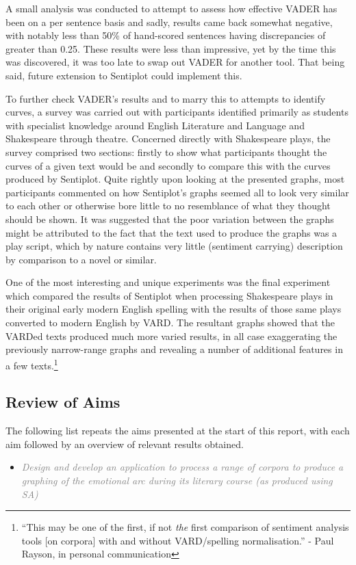 \documentclass{article}
\begin{document}
{    A small analysis was conducted to attempt to assess how effective VADER has been on a per sentence basis and sadly, results came back somewhat negative, with notably less than 50\% of hand-scored sentences having discrepancies of greater than 0.25. These results were less than impressive, yet by the time this was discovered, it was too late to swap out VADER for another tool. That being said, future extension to Sentiplot could implement this.
    
    To further check VADER's results and to marry this to attempts to identify curves, a survey was carried out with participants identified primarily as students with specialist knowledge around English Literature and Language and Shakespeare through theatre. Concerned directly with Shakespeare plays, the survey comprised two sections: firstly to show what participants thought the curves of a given text would be and secondly to compare this with the curves produced by Sentiplot. Quite rightly upon looking at the presented graphs, most participants commented on how Sentiplot's graphs seemed all to look very similar to each other or otherwise bore little to no resemblance of what they thought should be shown. It was suggested that the poor variation between the graphs might be attributed to the fact that the text used to produce the graphs was a play script, which by nature contains very little (sentiment carrying) description by comparison to a novel or similar.

    One of the most interesting and unique experiments was the final experiment which compared the results of Sentiplot when processing Shakespeare plays in their original early modern English spelling with the results of those same plays converted to modern English by VARD. The resultant graphs showed that the VARDed texts produced much more varied results, in all case exaggerating the previously narrow-range graphs and revealing a number of additional features in a few texts.\footnote{``This may be one of the first, if not \textit{the} first comparison of sentiment analysis tools [on corpora] with and without VARD/spelling normalisation.'' - Paul Rayson, in personal communication}
    \subsection{Review of Aims}
        The following list repeats the aims presented at the start of this report, with each aim followed by an overview of relevant results obtained.
        \begin{itemize}
            \item \textcolor{gray}{\textit{Design and develop an application to process a range of corpora to produce a graphing of the emotional arc during its literary course (as produced using SA)}}
            

\end{itemize}}
\end{document}
